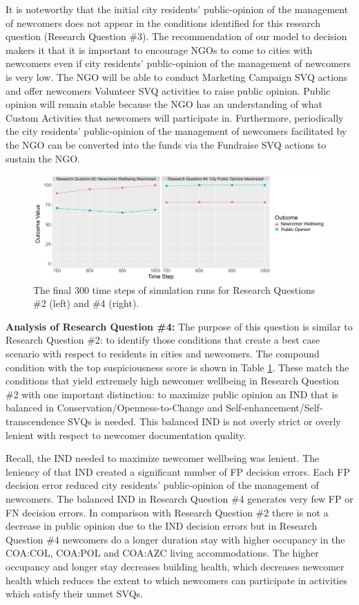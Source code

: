 \documentclass{scspaperproc}
\theoremstyle{scsthe}
\begin{document}
It is noteworthy that the initial city residents' public-opinion of the management of newcomers does not appear in the conditions identified for this research question (Research Question \#3). The recommendation of our model to decision makers it that it is important to encourage NGOs to come to cities with newcomers even if city residents' public-opinion of the management of newcomers is very low. The NGO will be able to conduct Marketing Campaign SVQ actions and offer newcomers Volunteer SVQ activities to raise public opinion. Public opinion will remain stable because the NGO has an understanding of what Custom Activities that newcomers will participate in. Furthermore, periodically the city residents' public-opinion of the management of newcomers facilitated by the NGO can be converted into the funds via the Fundraise SVQ actions to sustain the NGO.


\label{sec:rq4}

\begin{figure}[htb]
{
\centering
\includegraphics[width=0.67\columnwidth]{WellbeingVsPublicOpinionGraph.png}
\caption{The final 300 time steps of simulation runs for Research Questions \#2 (left) and \#4 (right).}
\label{fig:wellbeingvspo}
}
\end{figure}

{\bf Analysis of Research Question \#4:} The purpose of this question is similar to Research Question \#2: to identify those conditions that create a best case scenario with respect to residents in cities and newcomers. The compound condition with the top suspiciousness score is shown in Table \ref{fig:wellbeingvspo}. These match the conditions that yield extremely high newcomer wellbeing in Research Question \#2 with one important distinction: to maximize public opinion an IND that is balanced in Conservation/Openness-to-Change and Self-enhancement/Self-transcendence SVQs is needed. This balanced IND is not overly strict or overly lenient with respect to newcomer documentation quality. 

Recall, the IND needed to maximize newcomer wellbeing was lenient.  The leniency of that IND created a significant number of FP decision errors. Each FP decision error reduced city residents' public-opinion of the management of newcomers. The balanced IND in Research Question \#4 generates very few FP or FN decision errors. In comparison with Research Question \#2 there is not a decrease in public opinion due to the IND decision errors but in Research Question \#4 newcomers do a longer duration stay with higher occupancy in the COA:COL, COA:POL and COA:AZC living accommodations. The higher occupancy and longer stay decreases building health, which decreases newcomer health which reduces the extent to which newcomers can participate in activities which satisfy their unmet SVQs. 
\end{document}
